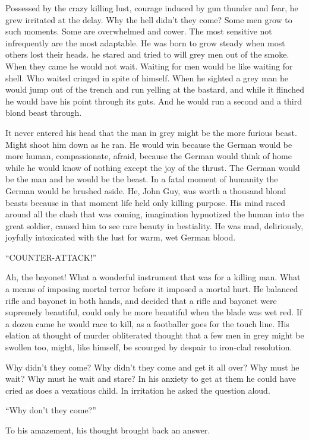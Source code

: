 Possessed by the crazy killing lust, courage induced by gun thunder and fear, he grew irritated at the delay. Why the hell didn't they come? Some men grow to such moments. Some are overwhelmed and cower. The most sensitive not infrequently are the most adaptable. He was born to grow steady when most others lost their heads. he stared and tried to will grey men out of the smoke. When they came he would not wait. Waiting for men would be like waiting for shell. Who waited cringed in spite of himself. When he sighted a grey man he would jump out of the trench and run yelling at the bastard, and while it flinched he would have his point through its guts. And he would run a second and a third blond beast through.

It never entered his head that the man in grey might be the more furious beast. Might shoot him down as he ran. He would win because the German would be more human, compassionate, afraid, because the German would think of home while he would know of nothing except the joy of the thrust. The German would be the man and he would be the beast. In a fatal moment of humanity the German would be brushed aside. He, John Guy, was worth a thousand blond beasts because in that moment life held only killing purpose. His mind raced around all the clash that was coming, imagination hypnotized the human into the great soldier, caused him to see rare beauty in bestiality. He was mad, deliriously, joyfully intoxicated with the lust for warm, wet German blood.

``COUNTER-ATTACK!''

Ah, the bayonet! What a wonderful instrument that was for a killing man. What a means of imposing mortal terror before it imposed a mortal hurt. He balanced rifle and bayonet in both hands, and decided that a rifle and bayonet were supremely beautiful, could only be more beautiful when the blade was wet red. If a dozen came he would race to kill, as a footballer goes for the touch line. His elation at thought of murder obliterated thought that a few men in grey might be swollen too, might, like himself, be scourged by despair to iron-clad resolution.

Why didn't they come? Why didn't they come and get it all over? Why must he wait? Why must he wait and stare? In his anxiety to get at them he could have cried as does a vexatious child. In irritation he asked the question aloud.

``Why don't they come?''

To his amazement, his thought brought back an answer.

